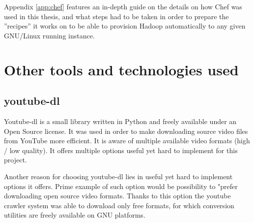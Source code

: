 Appendix \ref{app:chef} features an in-depth guide on the details on how Chef was used in this thesis, and what steps had to be taken in order to prepare the ''recipes'' it works on to be able to provision Hadoop automatically to any given GNU/Linux running instance.


\section{Other tools and technologies used}
\label{sec:other tools}

\subsection{youtube-dl}
Youtube-dl is a small library written in Python and freely available under an Open Source license. 
It was used in order to make downloading source video files from YouTube more efficient. It is aware of multiple available video formats (high / low quality). It offers multiple options useful yet hard to implement for this project.

Another reason for choosing youtube-dl lies in useful yet hard to implement options it offers. Prime example of such option would be possibility to "prefer downloading open source video formats. Thanks to this option the youtube crawler system was able to download only free formats, for which conversion utilities are freely available on GNU platforms.

%
%












